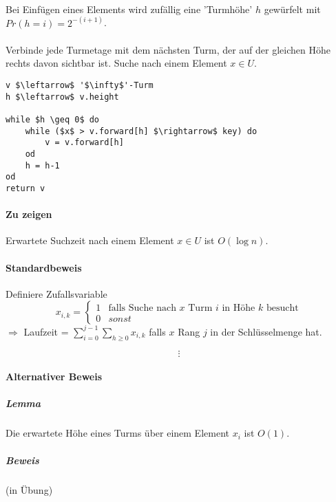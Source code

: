 \paragraph*{} Bei Einfügen eines Elements wird zufällig eine 'Turmhöhe' $h$ gewürfelt mit $Pr(h=i)=2^{-(i+1)}$.

\paragraph*{} Verbinde jede Turmetage mit dem nächsten Turm, der auf der gleichen Höhe rechts davon sichtbar ist. Suche nach einem Element $x \in U$.

\begin{lstlisting}[mathescape]
v $\leftarrow$ '$\infty$'-Turm
h $\leftarrow$ v.height

while $h \geq 0$ do
	while ($x$ > v.forward[h] $\rightarrow$ key) do
		v = v.forward[h]
	od
	h = h-1
od
return v
\end{lstlisting}

\paragraph*{Zu zeigen} Erwartete Suchzeit nach einem Element $x \in U$ ist $O(\log n)$.

\paragraph*{Standardbeweis} Definiere Zufallsvariable
\begin{equation}
   x_{i,k} = 
   \begin{cases}
     1 & \text{falls Suche nach } x \text{ Turm } i \text{ in Höhe } k \text{ besucht} \\
     0 & sonst
   \end{cases}
\end{equation}
$\Rightarrow$ Laufzeit = $\sum\limits_{i=0}^{j-1} \sum\limits_{h \geq 0} x_{i,k}$ falls $x$ Rang $j$ in der Schlüsselmenge hat.

$$\vdots$$

\paragraph*{Alternativer Beweis}
\subparagraph*{Lemma} Die erwartete Höhe eines Turms über einem Element $x_i$ ist $O(1)$.
\subparagraph*{Beweis} (in Übung)

